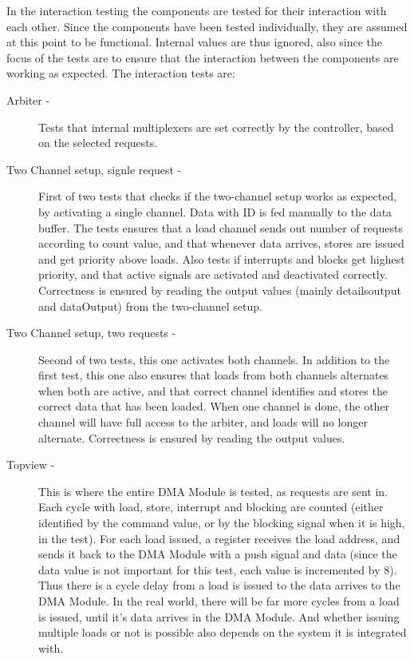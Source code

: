 \begin{appendix}
In the interaction testing the components are tested for their interaction with each other.
Since the components have been tested individually, they are assumed at this point to be functional. 
Internal values are thus ignored, also since the focus of the tests are to ensure that the interaction between the components are working as expected.
The interaction tests are:
\begin{description}
    \item[Arbiter -]
    Tests that internal multiplexers are set correctly by the controller, based on the selected requests.
    \item[Two Channel setup, signle request -]
    First of two tests that checks if the two-channel setup works as expected, by activating a single channel.
    Data with ID is fed manually to the data buffer.
    The tests ensures that a load channel sends out number of requests according to count value, and that whenever data arrives, stores are issued and get priority above loads.
    Also tests if interrupts and blocks get highest priority, and that active signals are activated and deactivated correctly.
    Correctness is ensured by reading the output values (mainly detailsoutput and dataOutput) from the two-channel setup.
    \item[Two Channel setup, two requests -]
    Second of two tests, this one activates both channels.
    In addition to the first test, this one also ensures that loads from both channels alternates when both are active, and that correct channel identifies and stores the correct data that has been loaded.
    When one channel is done, the other channel will have full access to the arbiter, and loads will no longer alternate.
    Correctness is ensured by reading the output values.
    \item[Topview -]
    This is where the entire DMA Module is tested, as requests are sent in.
    Each cycle with load, store, interrupt and blocking are counted (either identified by the command value, or by the blocking signal when it is high, in the test).
    For each load issued, a register receives the load address, and sends it back to the DMA Module with a push signal and data (since the data value is not important for this test, each value is incremented by 8).
    Thus there is a cycle delay from a load is issued to the data arrives to the DMA Module.
    In the real world, there will be far more cycles from a load is issued, until it's data arrives in the DMA Module.
    And whether issuing multiple loads or not is possible also depends on the system it is integrated with.

\end{description}
\end{appendix}
